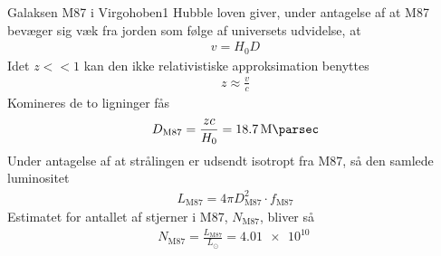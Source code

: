 \begin{opgave}{Galaksen M87 i Virgohoben}{1}
	\opg Hubble loven giver, under antagelse af at M87 bevæger sig væk fra jorden som følge af universets udvidelse, at
	\begin{align*}
	v = H_0D
	\end{align*}
	Idet $z<<1$ kan den ikke relativistiske approksimation benyttes
	\begin{align*}
	z\approx\frac{v}{c}
	\end{align*}
	Komineres de to ligninger fås
	\begin{align*}
	D_\text{M87} = \frac{zc}{H_0} = \SI{18,7}{\mega\parsec}
	\end{align*}
	\opg Under antagelse af at strålingen er udsendt isotropt fra M87, så den samlede luminositet
	\begin{align*}
	L_\text{M87} = 4\pi D_\text{M87}^2\cdot f_\text{M87}
	\end{align*}
	Estimatet for antallet af stjerner i M87, $N_\text{M87}$, bliver så
	\begin{align*}
	N_\text{M87} = \frac{L_\text{M87}}{L_\odot} = \SI{4,01e10}{}
	\end{align*}
\end{opgave}
